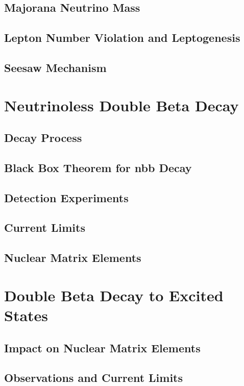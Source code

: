 \subsection{Majorana Neutrino Mass}
\subsection{Lepton Number Violation and Leptogenesis}
\subsection{Seesaw Mechanism}

\section{Neutrinoless Double Beta Decay}
\subsection{Decay Process}
\subsection{Black Box Theorem for \0nbb Decay}
\subsection{Detection Experiments}
\subsection{Current Limits}
\subsection{Nuclear Matrix Elements}
\section{Double Beta Decay to Excited States}
\subsection{Impact on Nuclear Matrix Elements}
\subsection{Observations and Current Limits}



